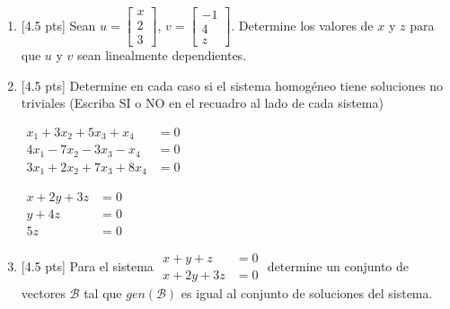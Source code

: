 \documentclass[11pt]{article}
\newcommand{\casillasino}{\fbox{\phantom{XX}}}
\begin{document}
\begin{enumerate}
\item{}[4.5 pts] Sean $u = \begin{bmatrix}x\\2\\3\end{bmatrix}$, $v = \begin{bmatrix}-1\\4\\z\end{bmatrix}$. Determine los valores de $x$ y $z$ para que $u$ y $v$ sean linealmente dependientes.

\vspace{4pt}

\item{}[4.5 pts] Determine en cada caso si el sistema homogéneo tiene soluciones no triviales (Escriba SI o NO en el recuadro al lado de cada sistema)

\vspace{6pt}
\noindent
\begin{minipage}[t]{0.46\linewidth}
$\begin{aligned}
x_1+3x_2+5x_3+x_4 &=0\\
4x_1-7x_2-3x_3-x_4 &=0\\
3x_1+2x_2+7x_3+8x_4 &=0
\end{aligned}$
\end{minipage}%
\hfill\casillasino\hfill
\begin{minipage}[t]{0.32\linewidth}
$\begin{aligned}
x+2y+3z &=0\\
y+4z &=0\\
5z &=0
\end{aligned}$
\end{minipage}%
\hfill\casillasino

\item{}[4.5 pts] Para el sistema $\begin{aligned}x+y+z&=0\\x+2y+3z&=0\end{aligned}$ determine un conjunto de vectores $\mathcal{B}$ tal que $gen(\mathcal{B})$ es igual al conjunto de soluciones del sistema.

\vspace{4pt}


\end{enumerate}
\end{document}
